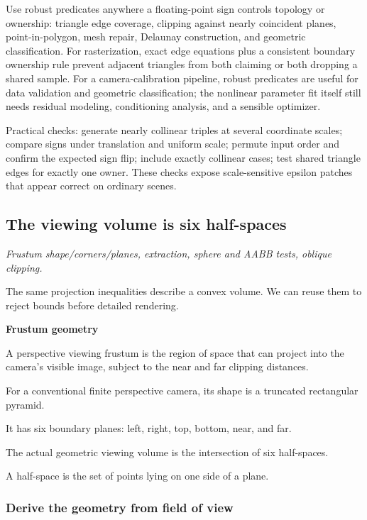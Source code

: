 Use robust predicates anywhere a floating-point sign controls topology or ownership: triangle edge coverage, clipping against nearly coincident planes, point-in-polygon, mesh repair, Delaunay construction, and geometric classification. For rasterization, exact edge equations plus a consistent boundary ownership rule prevent adjacent triangles from both claiming or both dropping a shared sample. For a camera-calibration pipeline, robust predicates are useful for data validation and geometric classification; the nonlinear parameter fit itself still needs residual modeling, conditioning analysis, and a sensible optimizer.

Practical checks: generate nearly collinear triples at several coordinate scales; compare signs under translation and uniform scale; permute input order and confirm the expected sign flip; include exactly collinear cases; test shared triangle edges for exactly one owner. These checks expose scale-sensitive epsilon patches that appear correct on ordinary scenes.

\subsection{The viewing volume is six half-spaces}\label{the-viewing-volume-is-six-half-spaces}

\emph{Frustum shape/corners/planes, extraction, sphere and AABB tests, oblique clipping.}

The same projection inequalities describe a convex volume. We can reuse them to reject bounds before detailed rendering.

\textbf{Frustum geometry}

A perspective viewing frustum is the region of space that can project into the camera's visible image, subject to the near and far clipping distances.

For a conventional finite perspective camera, its shape is a truncated rectangular pyramid.

It has six boundary planes: left, right, top, bottom, near, and far.

The actual geometric viewing volume is the intersection of six half-spaces.

A half-space is the set of points lying on one side of a plane.

\subsubsection{Derive the geometry from field of view}\label{derive-the-geometry-from-field-of-view}

